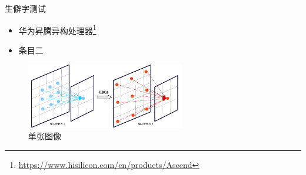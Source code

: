 \documentclass[
    fontset=fandol,
    xcolor=svgnames %
]{ctexbeamer}
\begin{document}
\begin{frame}

    \begin{block}{生僻字测试}
        \begin{itemize}
            \item 华为昇腾异构处理器\footnote{\url{https://www.hisilicon.com/cn/products/Ascend}}
            \item 条目二
        \end{itemize}
    \end{block}

    \begin{figure}
        \includegraphics[width=0.618\textwidth]{../image/chap04/illustration/hole.pdf}
        \caption{单张图像}
        \label{fig:hole}
    \end{figure}

\end{frame}
\end{document}
